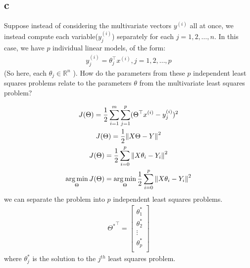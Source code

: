 \documentclass[12pt]{article}
\DeclareMathOperator*{\argmin}{arg\,min}
\begin{document}
\subsection{c}
Suppose instead of considering the multivariate vectors $y^{(i)}$ all at once, we instead compute each variable($y_{j}^{(i)}$) separately for each $j = 1, 2, \dots, n$. In this case, we have $p$ individual linear models, of the form:
\begin{gather*}
    y_{j}^{(i)} = \theta_{j}^\top x^{(i)} , j = 1, 2, \dots, p
\end{gather*}
(So here, each $\theta_{j} \in \mathbb{R}^{n}$ ). How do the parameters from these $p$ independent least squares problems relate to the parameters $\theta$ from the multivariate least squares problem?
\begin{qsolve}
    \begin{gather*}
        J(\Theta) = \frac{1}{2} \sum_{i=1}^{m} \sum_{j=1}^{p} (\Theta^\top x^{(i)} - y_j^{(i)})^2 \\
        J(\Theta) = \frac{1}{2} \norm{X \Theta - Y}^2 \\
        J(\Theta) = \frac{1}{2} \sum_{i=0}^{p} \norm{X \theta_{i} - Y_{i}}^2 \\
        \argmin_{\Theta} J(\Theta) = \argmin_{\Theta} \frac{1}{2} \sum_{i=0}^{p} \norm{X \theta_{i} - Y_{i}}^2 \\
    \end{gather*}
    we can separate the problem into $p$ independent least squares problems.
    \begin{gather*}
        {\Theta^{*}}^\top = \begin{bmatrix}
            \theta_{1}^{*} \\
            \theta_{2}^{*} \\
            \vdots         \\
            \theta_{p}^{*} \\
        \end{bmatrix}
    \end{gather*}
    where $\theta_{j}^{*}$ is the solution to the $j^{th}$ least squares problem.
\end{qsolve}
\end{document}
